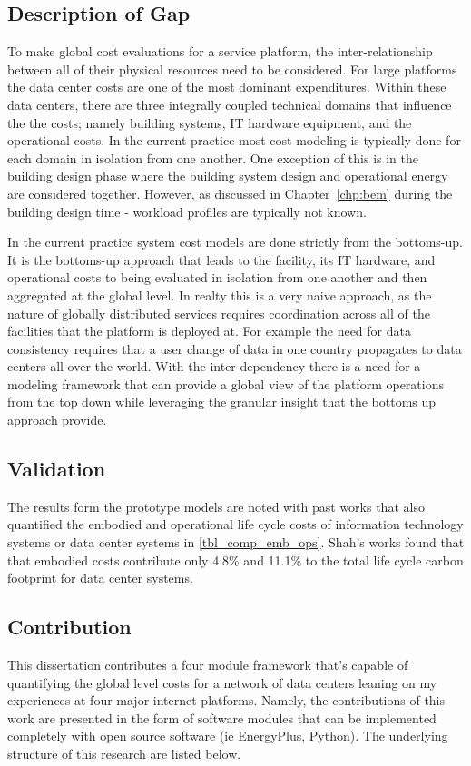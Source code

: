\subsection{Description of Gap}
To make global cost evaluations for a service platform, the inter-relationship between all of their physical resources need to be considered. For large platforms the data center costs are one of the most dominant expenditures. Within these data centers, there are three integrally coupled technical domains that influence the the costs; namely building systems, IT hardware equipment, and the operational costs. In the current practice most cost modeling is typically done for each domain in isolation from one another. One exception of this is in the building design phase where the building system design and operational energy are considered together. However, as discussed in Chapter~\ref{chp:bem} during the building design time - workload profiles are typically not known. 

In the current practice system cost models are done strictly from the bottoms-up. It is the bottoms-up approach that leads to the facility, its IT hardware, and operational costs to being evaluated in isolation from one another and then aggregated at the global level. In realty this is a very naive approach, as the nature of globally distributed services requires coordination across all of the facilities that the platform is deployed at. For example the need for data consistency requires that a user change of data in one country  propagates to data centers all over the world. With the inter-dependency there is a need for a modeling framework that can provide a global view of the platform operations from the top down while leveraging the granular insight that the bottoms up approach provide. 

\subsection{Validation}

The results form the prototype models are noted with past works that also quantified the embodied and operational life cycle costs of information technology systems or data center systems in \ref{tbl_comp_emb_ops}. Shah's works found that that embodied costs contribute only 4.8\% and 11.1\% to the total life cycle carbon footprint for data center systems.


\subsection{Contribution}
This dissertation contributes a four module framework that's capable of quantifying the global level costs for a network of data centers leaning on my experiences at four major internet platforms. Namely, the contributions of this work are presented in the form of software modules that can be implemented completely with open source software (ie EnergyPlus, Python). The underlying structure of this research are listed below.

